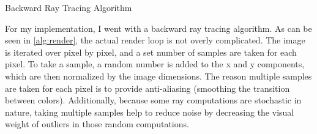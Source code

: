 \documentclass[10pt]{IEEEtran}
\begin{document}
\begin{algorithm}[b]
    \caption{Backward Ray Tracing Algorithm}\label{alg:render}
    \scriptsize
\end{algorithm}

For my implementation, I went with a backward ray tracing algorithm. As can be seen in
\cref{alg:render}, the actual render loop is not overly complicated. The image is iterated over
pixel by pixel, and a set number of samples are taken for each pixel. To take a sample, a random
number is added to the x and y components, which are then normalized by the image dimensions. The
reason multiple samples are taken for each pixel is to provide anti-aliasing (smoothing the
transition between colors). Additionally, because some ray computations are stochastic in nature,
taking multiple samples help to reduce noise by decreasing the visual weight of outliers in those
random computations.
\end{document}

